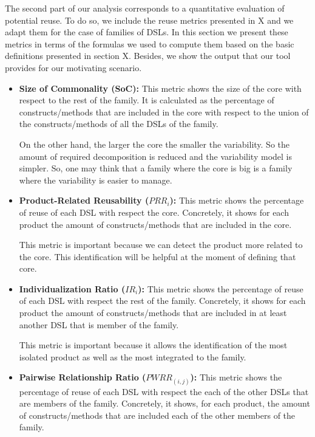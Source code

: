 The second part of our analysis corresponds to a quantitative evaluation of potential reuse. To do so, we include the reuse metrics presented in X and we adapt them for the case of families of DSLs. In this section we present these metrics in terms of the formulas we used to compute them based on the basic definitions presented in section X. Besides, we show the output that our tool provides for our motivating scenario. 

\begin{itemize}
\item \textbf{Size of Commonality (SoC):} This metric shows the size of the core with respect to the rest of the family. It is calculated as the percentage of constructs/methods that are included in the core with respect to the union of the constructs/methods of all the DSLs of the family. 

\hspace{3mm} On the other hand, the larger the core the smaller the variability. So the amount of required decomposition is reduced and the variability model is simpler. So, one may think that a family where the core is big is a family where the variability is easier to manage. 

\vspace{2mm}
\item \textbf{Product-Related Reusability ($PRR_i$):}
This metric shows the percentage of reuse of each DSL with respect the core. Concretely, it shows for each product the amount of constructs/methods that are included in the core.

\hspace{3mm} This metric is important because we can detect the product more related to the core. This identification will be helpful at the moment of defining that core. 

\vspace{2mm}
\item \textbf{Individualization Ratio ($IR_i$):}
This metric shows the percentage of reuse of each DSL with respect the rest of the family. Concretely, it shows for each product the amount of constructs/methods that are included in at least another DSL that is member of the family.

\hspace{3mm} This metric is important because it allows the identification of the most isolated product as well as the most integrated to the family.

\vspace{2mm}
\item \textbf{Pairwise Relationship Ratio ($PWRR_{(i,j)}$):} 
This metric shows the percentage of reuse of each DSL with respect the each of the other DSLs that are members of the family. Concretely, it shows, for each product, the amount of constructs/methods that are included each of the other members of the family.
\end{itemize}

